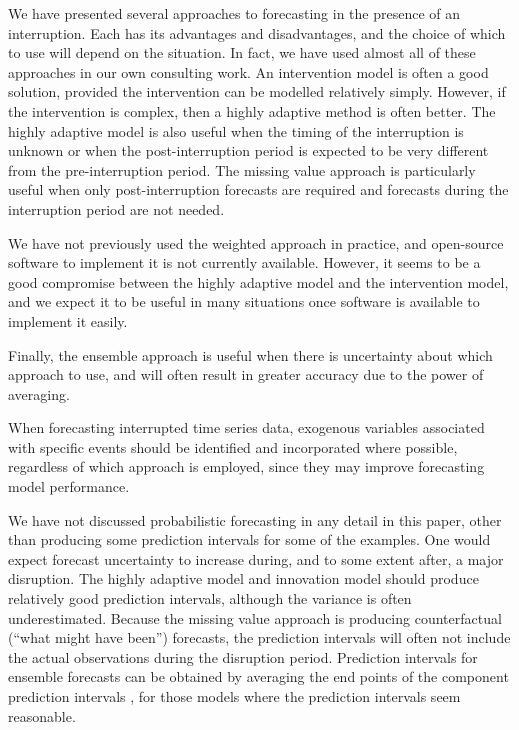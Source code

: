 \documentclass[
  11pt,
  a4paper,
]{article}
\begin{document}
We have presented several approaches to forecasting in the presence of
an interruption. Each has its advantages and disadvantages, and the
choice of which to use will depend on the situation. In fact, we have
used almost all of these approaches in our own consulting work. An
intervention model is often a good solution, provided the intervention
can be modelled relatively simply. However, if the intervention is
complex, then a highly adaptive method is often better. The highly
adaptive model is also useful when the timing of the interruption is
unknown or when the post-interruption period is expected to be very
different from the pre-interruption period. The missing value approach
is particularly useful when only post-interruption forecasts are
required and forecasts during the interruption period are not needed.

We have not previously used the weighted approach in practice, and
open-source software to implement it is not currently available.
However, it seems to be a good compromise between the highly adaptive
model and the intervention model, and we expect it to be useful in many
situations once software is available to implement it easily.

Finally, the ensemble approach is useful when there is uncertainty about
which approach to use, and will often result in greater accuracy due to
the power of averaging.

When forecasting interrupted time series data, exogenous variables
associated with specific events should be identified and incorporated
where possible, regardless of which approach is employed, since they may
improve forecasting model performance.

We have not discussed probabilistic forecasting in any detail in this
paper, other than producing some prediction intervals for some of the
examples. One would expect forecast uncertainty to increase during, and
to some extent after, a major disruption. The highly adaptive model and
innovation model should produce relatively good prediction intervals,
although the variance is often underestimated. Because the missing value
approach is producing counterfactual (``what might have been'')
forecasts, the prediction intervals will often not include the actual
observations during the disruption period. Prediction intervals for
ensemble forecasts can be obtained by averaging the end points of the
component prediction intervals \autocite{lichtendahl2013better}, for
those models where the prediction intervals seem reasonable.
\end{document}

